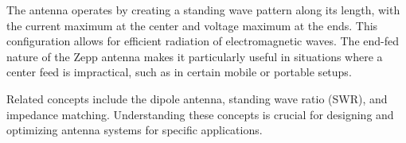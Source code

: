 The antenna operates by creating a standing wave pattern along its length, with the current maximum at the center and voltage maximum at the ends. This configuration allows for efficient radiation of electromagnetic waves. The end-fed nature of the Zepp antenna makes it particularly useful in situations where a center feed is impractical, such as in certain mobile or portable setups.

Related concepts include the dipole antenna, standing wave ratio (SWR), and impedance matching. Understanding these concepts is crucial for designing and optimizing antenna systems for specific applications.

